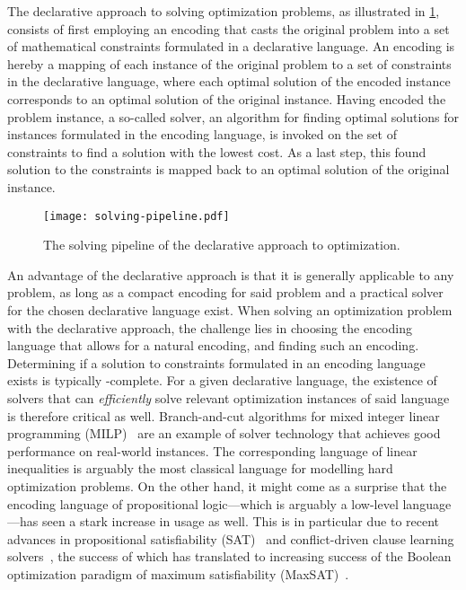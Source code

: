 The declarative approach to solving optimization problems, as illustrated in \cref{fig:solving-pipeline}, consists of first employing an encoding that casts the original problem into a set of mathematical constraints formulated in a declarative language.
An encoding is hereby a mapping of each instance of the original problem to a set of constraints in the declarative language, where each optimal solution of the encoded instance corresponds to an optimal solution of the original instance.
Having encoded the problem instance, a so-called solver, an algorithm for finding optimal solutions for instances formulated in the encoding language, is invoked on the set of constraints to find a solution with the lowest cost.
As a last step, this found solution to the constraints is mapped back to an optimal solution of the original instance.

\begin{figure}
  \centering
  \texttt{[image: solving-pipeline.pdf]}
  \caption{The solving pipeline of the declarative approach to optimization.}\label{fig:solving-pipeline}
\end{figure}

An advantage of the declarative approach is that it is generally applicable to any problem, as long as a compact encoding for said problem and a practical solver for the chosen declarative language exist.
When solving an optimization problem with the declarative approach, the challenge lies in choosing the encoding language that allows for a natural encoding, and finding such an encoding.
Determining if a solution to constraints formulated in an encoding language exists is typically \NP-complete.
For a given declarative language, the existence of solvers that can \emph{efficiently} solve relevant optimization instances of said language is therefore critical as well.
Branch-and-cut algorithms for mixed integer linear programming (MILP)~\autocite{ChenEtAl2010-intro,KorteVygen2018-5} are an example of solver technology that achieves good performance on real-world instances.
The corresponding language of linear inequalities is arguably the most classical language for modelling hard optimization problems.
On the other hand, it might come as a surprise that the encoding language of propositional logic---which is arguably a low-level language---has seen a stark increase in usage as well.
This is in particular due to recent advances in propositional satisfiability (SAT)~\autocite{handbook2-sat} and conflict-driven clause learning solvers~\autocite{handbook2-cdcl}, the success of which has translated to increasing success of the Boolean optimization paradigm of maximum satisfiability (MaxSAT)~\autocite{handbook2-maxsat}.

